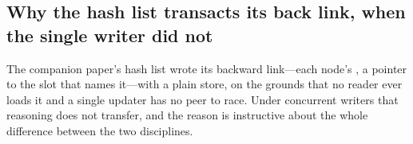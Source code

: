 \documentclass[11pt]{article}
\begin{document}
%

\subsection{Why the hash list transacts its back link, when the single writer
did not}
\label{sec:hlistpprev}

The companion paper's hash list wrote its backward link---each node's
, a pointer to the slot that names it---with a plain store, on the
grounds that no reader ever loads it and a single updater has no peer to race.
Under concurrent writers that reasoning does not transfer, and the reason is
instructive about the whole difference between the two disciplines.
\end{document}
